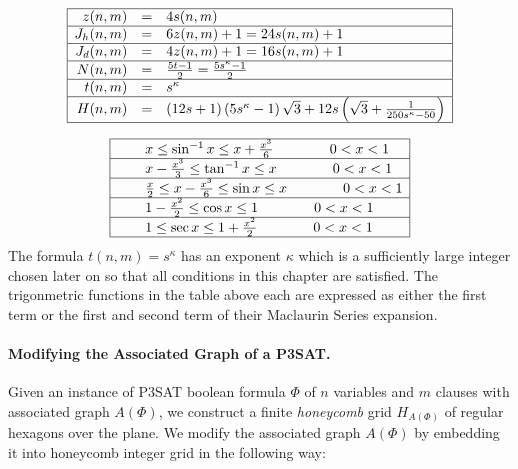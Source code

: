 \documentclass[10pt]{CSUNthesis}
\theoremstyle{plain}%
\theoremstyle{definition}
\theoremstyle{remark}
\newcommand{\lr}[1]{\left( #1 \right)}
\begin{document}
$$
\begin{array}{|rcl|}
\hline
z(n,m)		&=& 4 s(n,m)\\\hline
J_h (n,m) 	&=& 6z(n,m)+1 = 24s(n,m)+1 \\\hline
J_d (n,m) 	&=& 4z(n,m)+1												= 16s(n,m)+1  			\\\hline
N(n,m)		&=& \frac{5t-1}{2}											= \frac{5s^\kappa-1}{2}	\\\hline
t(n,m)		&=& s^\kappa																		\\\hline
H(n,m) 		&=&  (12s+1)  \lr{5s^\kappa -1}  \sqrt{3} + 12s \lr{\sqrt{3}+ \frac{1}{250s^\kappa -50}}				\\\hline
\end{array}
$$


$$
\begin{array}{|rcl|}
\hline
&& x 				\leq \sin^{-1} x \leq x + \frac{x^3}{6} \qquad\qquad 0< x <1 \\\hline
&& x - \frac{x^3}{3}\leq \tan^{-1} x \leq x 				\qquad\qquad 0< x < 1\\\hline
&& \frac{x}{2}\leq x - \frac{x^3}{6}\leq \sin x 	 \leq x 				\qquad\qquad 0< x < 1\\\hline
&& 1 - \frac{x^2}{2}\leq \cos x 	 \leq 1 				\qquad\qquad 0< x < 1\\\hline
&& 1 				\leq \sec x 	 \leq 1 + \frac{x^2}{2} \qquad\qquad 0< x < 1\\\hline
\end{array}
$$
The formula $t(n,m)=s^\kappa$ has an exponent $\kappa$ which is a sufficiently large integer chosen later on so that all conditions in this chapter are satisfied.
The trigonmetric functions in the table above each are expressed as either the first term or the first and second term of their Maclaurin Series expansion.

\paragraph{Modifying the Associated Graph of a P3SAT.}

Given an instance of P3SAT boolean formula $\Phi$ of $n$ variables and $m$ clauses with associated graph $A(\Phi)$, we construct a finite \textit{honeycomb} grid $H_{A \lr{\Phi}}$ of regular hexagons over the plane.
We modify the associated graph $A\lr{\Phi}$ by embedding it into honeycomb integer grid in the following way:
\end{document}
